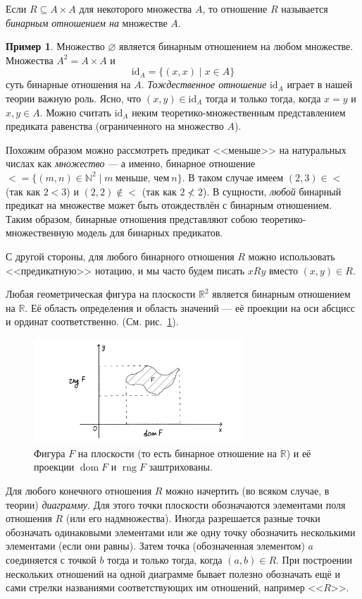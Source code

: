 \documentclass[12pt,notitlepage]{article}
\theoremstyle{plain}
\theoremstyle{definition}
\newtheorem{exm}[thm]{Пример}
\theoremstyle{plain}
\newcommand{\N}{\mathbb{N}}
\newcommand{\R}{\mathbb{R}}
\newcommand{\sbs}{\subseteq}
\newcommand{\void}{\varnothing}
\newcommand{\dom}{\mathop{\mathrm{dom}}}
\newcommand{\rng}{\mathop{\mathrm{rng}}}
\newcommand{\id}{\mathrm{id}}
\newcommand{\1}{\mathbf{1}}
\newcommand{\0}{\mathbf{0}}
\begin{document}
Если $R \sbs A \times A$ для некоторого множества $A$, то отношение $R$ называется \emph{бинарным отношением на} множестве $A$.
\begin{exm}
	Множество $\void$ является бинарным отношением на любом множестве. Множества $A^2 = A \times A$ и
	$$\id_A = \{(x,x) \mid x \in A \}$$
	суть бинарные отношения на $A$. \emph{Тождественное отношение} $\id_A$ играет в нашей теории важную роль. Ясно, что $(x,y) \in \id_A$ тогда и только тогда, когда $x = y$ и $x,y \in A$. Можно считать $\id_A$ неким теоретико-множественным представлением предиката равенства (ограниченного на множество $A$).
	
	Похожим образом можно рассмотреть предикат <<меньше>> на натуральных числах как \emph{множество} --- а именно, бинарное отношение ${<} = \{ (m, n) \in \N^2 \mid m\ \mbox{меньше, чем}\ n\}$. В таком случае имеем $(2,3) \in {<}$ (так как $2 < 3$) и $(2,2) \notin {<}$ (так как $2 \not< 2$). В сущности, \emph{любой} бинарный предикат на множестве может быть отождествлён с бинарным отношением. Таким образом, бинарные отношения представляют собою теоретико-множественную модель для бинарных предикатов.
	
	С другой стороны, для любого бинарного отношения $R$ можно использовать <<предикатную>> нотацию, и мы часто будем писать $x R y$ вместо $(x,y) \in R$.
	
	Любая геометрическая фигура на плоскости $\R^2$ является бинарным отношением на $\R$. Её область определения и область значений --- её проекции на оси абсцисс и ординат соответственно. (См. рис.~\ref{rel:proj}).
	\begin{figure}[h]
		\centering
		\includegraphics*[width=0.7\textwidth]{rel_proj.pdf}
		\caption{\label{rel:proj} Фигура $F$ на плоскости (то есть бинарное отношение на $\R$) и её проекции $\dom F$ и $\rng F$ заштрихованы.}
	\end{figure}
\end{exm}

Для любого конечного отношения $R$ можно начертить (во всяком случае, в теории) \emph{диаграмму}. Для этого точки плоскости обозначаются элементами поля отношения $R$ (или его надмножества). Иногда разрешается разные точки обозначать одинаковыми элементами или же одну точку обозначить несколькими элементами (если они равны). Затем точка (обозначенная элементом) $a$ соединяется с точкой $b$ тогда и только тогда, когда $(a,b) \in R$. При построении нескольких отношений на одной диаграмме бывает полезно обозначать ещё и сами стрелки названиями соответствующих им отношений, например <<$R$>>.
\end{document}
